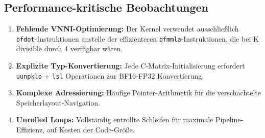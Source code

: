 \documentclass[11pt,a4paper]{article}
\begin{document}
\subsection{Performance-kritische Beobachtungen}
\begin{enumerate}
\item \textbf{Fehlende VNNI-Optimierung:} Der Kernel verwendet ausschließlich \texttt{bfdot}-Instruktionen anstelle der effizienteren \texttt{bfmmla}-Instruktionen, die bei K divisible durch 4 verfügbar wären.

\item \textbf{Explizite Typ-Konvertierung:} Jede C-Matrix-Initialisierung erfordert \texttt{uunpklo} + \texttt{lsl} Operationen zur BF16-FP32 Konvertierung.

\item \textbf{Komplexe Adressierung:} Häufige Pointer-Arithmetik für die verschachtelte Speicherlayout-Navigation.

\item \textbf{Unrolled Loops:} Vollständig entrollte Schleifen für maximale Pipeline-Effizienz, auf Kosten der Code-Größe.
\end{enumerate}
\end{document}
